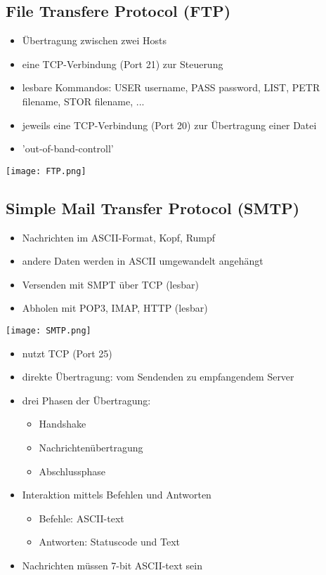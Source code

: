 	\subsection{File Transfere Protocol (FTP)}
		\begin{itemize}
			\item Übertragung zwischen zwei Hosts
			\item eine TCP-Verbindung (Port 21) zur Steuerung
			\item lesbare Kommandos: USER username, PASS password, LIST, PETR filename, STOR filename, ...
			\item jeweils eine TCP-Verbindung (Port 20) zur  Übertragung einer Datei
			\item 'out-of-band-controll'
		\end{itemize}
		\begin{center}
			\texttt{[image: FTP.png]}
		\end{center}
	\subsection{Simple Mail Transfer Protocol (SMTP)}
		\begin{itemize}
			\item Nachrichten im ASCII-Format, Kopf, Rumpf
			\item andere Daten werden in ASCII umgewandelt angehängt
			\item Versenden mit SMPT über TCP (lesbar)
			\item Abholen mit POP3, IMAP, HTTP (lesbar)
		\end{itemize}
		\begin{center}
			\texttt{[image: SMTP.png]}
		\end{center}
		\begin{itemize}
			\item nutzt TCP (Port 25)
			\item direkte Übertragung: vom Sendenden zu empfangendem Server
			\item drei Phasen der Übertragung:
				\begin{itemize}
					\item Handshake
					\item Nachrichtenübertragung
					\item Abschlussphase
				\end{itemize}
			\item Interaktion mittels Befehlen und Antworten
				\begin{itemize}
					\item Befehle: ASCII-text
					\item Antworten: Statuscode und Text
				\end{itemize}
			\item Nachrichten müssen 7-bit ASCII-text sein
		\end{itemize}

